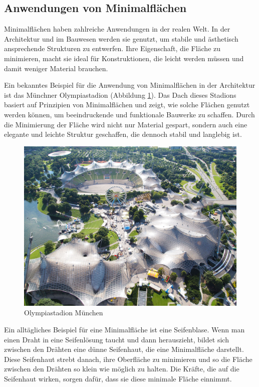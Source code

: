\subsection{Anwendungen von Minimalflächen
	\label{minimalflaechen:subsection:Anwendungen von Minimalflächen}}
Minimalflächen haben zahlreiche Anwendungen in der realen Welt.
In der Architektur und im Bauwesen werden sie genutzt, um stabile und ästhetisch ansprechende Strukturen zu entwerfen.
%
Ihre Eigenschaft, die Fläche zu minimieren, macht sie ideal für Konstruktionen, die leicht werden müssen und damit weniger Material brauchen.

Ein bekanntes Beispiel für die Anwendung von Minimalflächen in der Architektur ist das Münchner Olympiastadion (Abbildung \ref{fig:stadion-1}).
%
%
Das Dach dieses Stadions basiert auf Prinzipien von Minimalflächen und zeigt, wie solche Flächen genutzt werden können, um beeindruckende und funktionale Bauwerke zu schaffen.
Durch die Minimierung der Fläche wird nicht nur Material gespart, sondern auch eine elegante und leichte Struktur geschaffen, die dennoch stabil und langlebig ist.
\begin{figure}
	\centering
	\includegraphics[width=\textwidth]{"papers/minimalflaechen/Stadion 1"}
	\caption{Olympiastadion München \cite{minimalflaechen:Olympiastadion}}
	\label{fig:stadion-1}
\end{figure}


Ein alltägliches Beispiel für eine Minimalfläche ist eine Seifenblase.
%
Wenn man einen Draht in eine Seifenlösung taucht und dann herauszieht, bildet sich zwischen den Drähten eine dünne Seifenhaut, die eine Minimalfläche darstellt.
Diese Seifenhaut strebt danach, ihre Oberfläche zu minimieren und so die Fläche zwischen den Drähten so klein wie möglich zu halten.
Die Kräfte, die auf die Seifenhaut wirken, sorgen dafür, dass sie diese minimale Fläche einnimmt.

